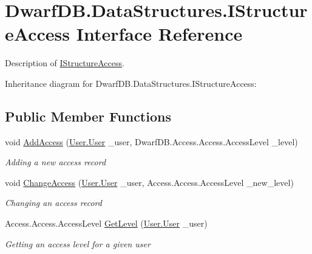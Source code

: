 \hypertarget{interface_dwarf_d_b_1_1_data_structures_1_1_i_structure_access}{\section{Dwarf\+D\+B.\+Data\+Structures.\+I\+Structure\+Access Interface Reference}
\label{interface_dwarf_d_b_1_1_data_structures_1_1_i_structure_access}
}


Description of \hyperlink{interface_dwarf_d_b_1_1_data_structures_1_1_i_structure_access}{I\+Structure\+Access}.  




Inheritance diagram for Dwarf\+D\+B.\+Data\+Structures.\+I\+Structure\+Access\+:
\subsection*{Public Member Functions}
\begin{DoxyCompactItemize}
\item 
void \hyperlink{interface_dwarf_d_b_1_1_data_structures_1_1_i_structure_access_ace284cb4dcb438adf1482a657ab4cdf5}{Add\+Access} (\hyperlink{class_dwarf_d_b_1_1_user_1_1_user}{User.\+User} \+\_\+user, Dwarf\+D\+B.\+Access.\+Access.\+Access\+Level \+\_\+level)
\begin{DoxyCompactList}\small\item\em Adding a new access record \end{DoxyCompactList}\item 
void \hyperlink{interface_dwarf_d_b_1_1_data_structures_1_1_i_structure_access_acd6eb6c44eab3b1a8524983a1f7016a3}{Change\+Access} (\hyperlink{class_dwarf_d_b_1_1_user_1_1_user}{User.\+User} \+\_\+user, Access.\+Access.\+Access\+Level \+\_\+new\+\_\+level)
\begin{DoxyCompactList}\small\item\em Changing an access record \end{DoxyCompactList}\item 
Access.\+Access.\+Access\+Level \hyperlink{interface_dwarf_d_b_1_1_data_structures_1_1_i_structure_access_a3bc398d0e80fe5442502e6fa3c68d298}{Get\+Level} (\hyperlink{class_dwarf_d_b_1_1_user_1_1_user}{User.\+User} \+\_\+user)
\begin{DoxyCompactList}\small\item\em Getting an access level for a given user \end{DoxyCompactList}\end{DoxyCompactItemize}



